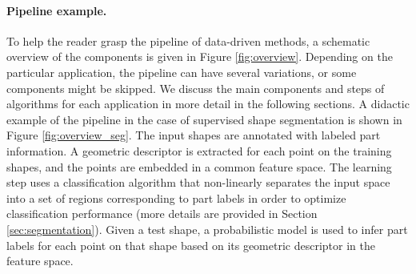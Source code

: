 \paragraph*{Pipeline example.}
To help the reader grasp the pipeline of data-driven methods, a schematic overview of the components is given in Figure \ref{fig:overview}.
Depending on the particular application, the pipeline can have several variations, or some components might be skipped. We discuss the main components and steps of algorithms for each application in more detail in the following sections. A didactic example of the pipeline in the case of supervised shape segmentation is shown in Figure \ref{fig:overview_seg}. The input shapes are annotated with labeled part information. A geometric descriptor is extracted for each point on the training shapes, and the points are embedded in a common feature space. The learning step uses a classification algorithm that non-linearly separates the input space into a set of regions corresponding to part labels in order to optimize classification performance (more details are provided in Section \ref{sec:segmentation}). Given a test shape, a probabilistic model is used to infer part labels for each point on that shape based on its geometric descriptor in the feature space.

